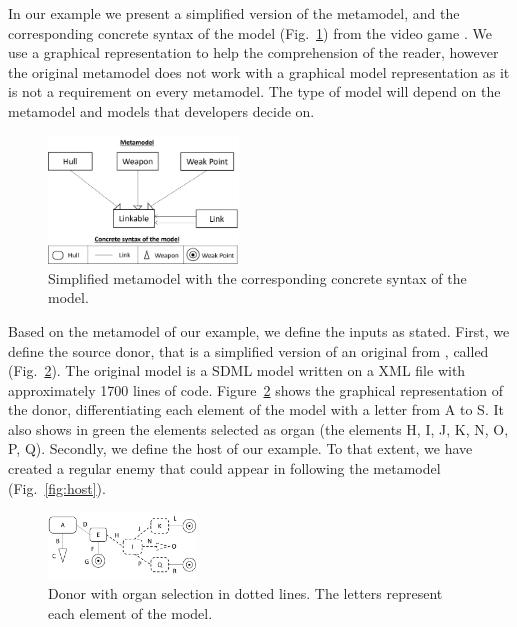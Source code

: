 In our example we present a simplified version of the metamodel, and the corresponding concrete syntax of the model (Fig.~\ref{fig:metamodel+syntax}) from the video game \CaseStudy{}. We use a graphical representation to help the comprehension of the reader, however the original metamodel does not work with a graphical model representation as it is not a requirement on every metamodel. The type of model will depend on the metamodel and models that developers decide on.

\begin{figure}[h]
    \centering
    \includegraphics[width=0.45\textwidth]{Figures/metamodel+syntax.png}
    \caption{Simplified metamodel with the corresponding concrete syntax of the model.}
    \label{fig:metamodel+syntax}
\end{figure}

Based on the metamodel of our example, we define the inputs as stated. 
First, we define the source donor, that is a simplified version of an original  from \CaseStudy{}, called  (Fig.~\ref{fig:donor}). The original model is a SDML model written on a XML file with approximately 1700 lines of code. Figure~\ref{fig:donor} shows the graphical representation of the donor, differentiating each element of the model with a letter from A to S. It also shows in green the elements selected as organ (the elements H, I, J, K, N, O, P, Q).
Secondly, we define the host of our example. To that extent, we have created a regular enemy that could appear in \CaseStudy{} following the metamodel (Fig.~\ref{fig:host}).

\begin{figure}[h]
    \centering
    \includegraphics[width=0.35\textwidth]{Figures/donor+organ.png}
    \caption{Donor with organ selection in dotted lines. The letters represent each element of the model.}
    \label{fig:donor}
\end{figure}

